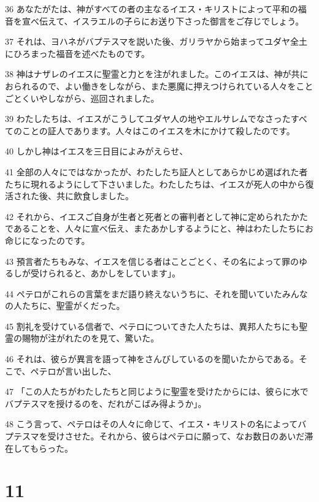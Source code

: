 \par 36 あなたがたは、神がすべての者の主なるイエス・キリストによって平和の福音を宣べ伝えて、イスラエルの子らにお送り下さった御言をご存じでしょう。
\par 37 それは、ヨハネがバプテスマを説いた後、ガリラヤから始まってユダヤ全土にひろまった福音を述べたものです。
\par 38 神はナザレのイエスに聖霊と力とを注がれました。このイエスは、神が共におられるので、よい働きをしながら、また悪魔に押えつけられている人々をことごとくいやしながら、巡回されました。
\par 39 わたしたちは、イエスがこうしてユダヤ人の地やエルサレムでなさったすべてのことの証人であります。人々はこのイエスを木にかけて殺したのです。
\par 40 しかし神はイエスを三日目によみがえらせ、
\par 41 全部の人々にではなかったが、わたしたち証人としてあらかじめ選ばれた者たちに現れるようにして下さいました。わたしたちは、イエスが死人の中から復活された後、共に飲食しました。
\par 42 それから、イエスご自身が生者と死者との審判者として神に定められたかたであることを、人々に宣べ伝え、またあかしするようにと、神はわたしたちにお命じになったのです。
\par 43 預言者たちもみな、イエスを信じる者はことごとく、その名によって罪のゆるしが受けられると、あかしをしています」。
\par 44 ペテロがこれらの言葉をまだ語り終えないうちに、それを聞いていたみんなの人たちに、聖霊がくだった。
\par 45 割礼を受けている信者で、ペテロについてきた人たちは、異邦人たちにも聖霊の賜物が注がれたのを見て、驚いた。
\par 46 それは、彼らが異言を語って神をさんびしているのを聞いたからである。そこで、ペテロが言い出した、
\par 47 「この人たちがわたしたちと同じように聖霊を受けたからには、彼らに水でバプテスマを授けるのを、だれがこばみ得ようか」。
\par 48 こう言って、ペテロはその人々に命じて、イエス・キリストの名によってバプテスマを受けさせた。それから、彼らはペテロに願って、なお数日のあいだ滞在してもらった。

\chapter{11}

